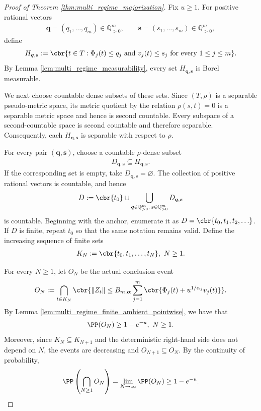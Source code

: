 \documentclass[11pt]{article}
\begin{document}
\begin{proof}[Proof of Theorem \ref{thm:multi_regime_majorization}]
Fix $u\ge1$. For positive rational vectors
\begin{align*}
\boldsymbol q=(q_1,\ldots,q_m)\in\mathbb Q_{>0}^m,
\qquad
\boldsymbol s=(s_1,\ldots,s_m)\in\mathbb Q_{>0}^m,
\end{align*}
define
\begin{align*}
H_{\boldsymbol q,\boldsymbol s}
:=
\cbr{
t\in T:
\Phi_j(t)\le q_j
\text{ and }
v_j(t)\le s_j
\text{ for every }1\le j\le m
}.
\end{align*}
By Lemma \ref{lem:multi_regime_measurability}, every set
$H_{\boldsymbol q,\boldsymbol s}$ is Borel measurable.

We next choose countable dense subsets of these sets. Since $(T,\rho)$
is a separable pseudo-metric space, its metric quotient by the relation
$\rho(s,t)=0$ is a separable metric space and hence is second countable.
Every subspace of a second-countable space is second countable and
therefore separable. Consequently, each
$H_{\boldsymbol q,\boldsymbol s}$ is separable with respect to $\rho$.

For every pair $(\boldsymbol q,\boldsymbol s)$, choose a countable
$\rho$-dense subset
\begin{align*}
D_{\boldsymbol q,\boldsymbol s}
\subseteq
H_{\boldsymbol q,\boldsymbol s}.
\end{align*}
If the corresponding set is empty, take
$D_{\boldsymbol q,\boldsymbol s}=\varnothing$. The collection of
positive rational vectors is countable, and hence
\begin{align*}
D
:=
\cbr{t_0}
\cup
\bigcup_{
\boldsymbol q\in\mathbb Q_{>0}^m,\,
\boldsymbol s\in\mathbb Q_{>0}^m
}
D_{\boldsymbol q,\boldsymbol s}
\end{align*}
is countable. Beginning with the anchor, enumerate it as
$D=\cbr{t_0,t_1,t_2,\ldots}$. If $D$ is finite, repeat $t_0$ so that the same notation remains
valid. Define the increasing sequence of finite sets
\begin{align*}
K_N
:=
\cbr{t_0,t_1,\ldots,t_N},
\ N\ge1.
\end{align*}

For every $N\ge1$, let $O_N$ be the actual conclusion event
\begin{align*}
O_N
:=
\bigcap_{t\in K_N}
\cbr{
\|Z_t\|
\le
B_{m,\boldsymbol\alpha}
\sum_{j=1}^m
\cbr{
\Phi_j(t)+u^{1/\alpha_j}v_j(t)
}
}.
\end{align*}
By Lemma \ref{lem:multi_regime_finite_ambient_pointwise}, we have that
\begin{align*}
\PP(O_N)
\ge
1-e^{-u},
\ N\ge1.
\end{align*}
Moreover, since $K_N\subseteq K_{N+1}$ and the deterministic
right-hand side does not depend on $N$, the events are decreasing and $O_{N+1}
\subseteq
O_N$. 
By the continuity of probability,
\begin{align*}
\PP\left(
\bigcap_{N\ge1}O_N
\right)
=
\lim_{N\to\infty}\PP(O_N)
\ge
1-e^{-u}.
\end{align*}


\end{proof}
\end{document}
